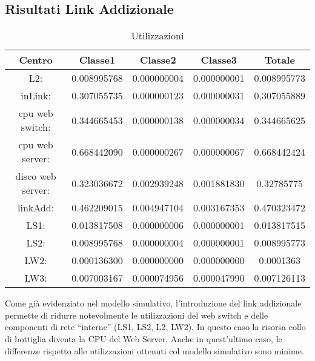 \subsection{Risultati Link Addizionale}
\begin{table}[H]
\begin{center}
\begin{tabular}{||c|c|c|c|c||}
\hline
Centro &Classe1 &Classe2 &Classe3 &Totale\\
\hline
\hline
L2: &0.008995768 &0.000000004 &0.000000001 &0.008995773\\
\hline
inLink: &0.307055735 &0.000000123 &0.000000031 &0,307055889\\
\hline
cpu web switch: &0.344665453 &0.000000138 &0.000000034 &0.344665625\\
\hline
cpu web server: &0.668442090 &0.000000267 &0.000000067 &0.668442424\\
\hline
disco web server: &0.323036672 &0.002939248 &0.001881830 &0.32785775\\
\hline
linkAdd: &0.462209015 &0.004947104 &0.003167353 &0.470323472\\
\hline
LS1: &0.013817508 &0.000000006 &0.000000001 &0.013817515\\
\hline
LS2: &0.008995768 &0.000000004 &0.000000001 &0.008995773\\
\hline
LW2: &0.000136300 &0.000000000 &0.000000000 &0.0001363\\
\hline
LW3: &0.007003167 &0.000074956 &0.000047990 &0.007126113\\
\hline
\end{tabular}
\end{center}
\caption{Utilizzazioni}
\label{utilizzazioni}
\end{table}
Come già evidenziato nel modello simulativo, l'introduzione del link addizionale permette di ridurre notevolmente le utilizzazioni del web switch e delle componenti di rete “interne” (LS1, LS2, L2, LW2). In questo caso la risorsa collo di bottiglia diventa la CPU del Web Server. Anche in quest'ultimo caso, le differenze rispetto alle utilizzazioni  ottenuti col modello simulativo sono minime.
